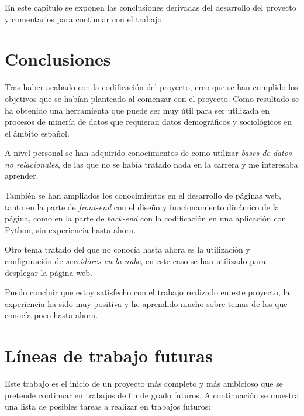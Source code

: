 
En este capítulo se exponen las conclusiones derivadas del desarrollo del proyecto y comentarios para continuar con el trabajo.

\section{Conclusiones}

Tras haber acabado con la codificación del proyecto, creo que se han cumplido los objetivos que se habían planteado al comenzar con el proyecto. Como resultado se ha obtenido una herramienta que puede ser muy útil para ser utilizada en procesos de minería de datos que requieran datos demográficos y sociológicos en el ámbito español.

A nivel personal se han adquirido conocimientos de como utilizar \textit{bases de datos no relacionales}, de las que no se había tratado nada en la carrera y me interesaba aprender.

También se han ampliados los conocimientos en el desarrollo de páginas web, tanto en la parte de \textit{front-end} con el diseño y funcionamiento dinámico de la página, como en la parte de \textit{back-end} con la codificación en una aplicación con Python, sin experiencia hasta ahora.

Otro tema tratado del que no conocía hasta ahora es la utilización y configuración de \textit{servidores en la nube}, en este caso se han utilizado para desplegar la página web.

Puedo concluir que estoy satisfecho con el trabajo realizado en este proyecto, la experiencia ha sido muy positiva y he aprendido mucho sobre temas de los que conocía poco hasta ahora.

\section{Líneas de trabajo futuras}

Este trabajo es el inicio de un proyecto más completo y más ambicioso que se pretende continuar en trabajos de fin de grado futuros. A continuación se muestra una lista de posibles tareas a realizar en trabajos futuros:

